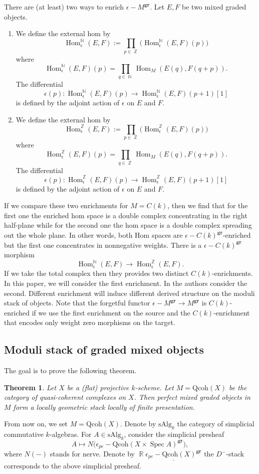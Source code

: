 \documentclass[reqno]{amsart}
\DeclareMathOperator\Z{\mathbb Z}
\DeclareMathOperator\R{\mathbb R}
\DeclareMathOperator\N{\mathbb N}
\newtheorem{theorem}{Theorem}[section]
\theoremstyle{definition}
\theoremstyle{remark}
\newcommand{\ul}{\underline}
\newcommand{\Hom}{\operatorname{Hom}}
\newcommand{\Spec}{\operatorname{Spec}}
\newcommand{\eps}{\epsilon}
\newcommand{\gr}{\mathbf{gr}}
\newcommand{\ep}{\epsilon}
\newcommand{\ska}{{\mathrm{sAlg}}_k}
\newcommand{\QC}{\mathrm{Qcoh}}
\numberwithin{equation}{section}
\begin{document}
There are (at least) two ways to enrich $\ep-M^\gr$. Let $E, F$ be two mixed graded objects.
\begin{enumerate}
\item[(1)] We define the external hom by
\[
\Hom^{\N}_\ep(E,F):=\prod_{p\in\Z}\Big(\Hom^{\N}_\ep(E,F)(p)\Big)
\] where 
\[
\Hom^{\N}_\ep(E,F)(p)=\prod_{q\in\N}\Hom_{M}(E(q),F(q+p)).
\] The differential 
\[
\ep(p): \Hom^{\N}_\ep(E,F)(p)\to \Hom^{\N}_\ep(E,F)(p+1)[1]
\] is defined by the adjoint action of $\ep$ on $E$ and $F$.
\item[(2)] We define the external hom by
\[
\Hom^{\Z}_\ep(E,F):=\prod_{p\in\Z}\Big(\Hom^{\Z}_\ep(E,F)(p)\Big)
\] where 
\[
\Hom^{\Z}_\ep(E,F)(p)=\prod_{q\in\Z}\Hom_{M}(E(q),F(q+p)).
\] The differential 
\[
\ep(p): \Hom^{\Z}_\ep(E,F)(p)\to \Hom^{\Z}_\ep(E,F)(p+1)[1]
\] is defined by the adjoint action of $\ep$ on $E$ and $F$.
\end{enumerate}
If we compare these two enrichments for $M=C(k)$, then we find that for the first one the enriched hom space is a double complex concentrating in the right half-plane while for the second one the hom space is a double complex spreading out the whole plane. In other words, both Hom spaces are $\eps-C(k)^\gr$-enriched but the first one concentrates in nonnegative weights.  There is a  $\eps-C(k)^\gr$ morphism  
\[
\Hom^{\N}_\ep(E,F)\to \Hom^{\Z}_\ep(E,F).
\]
If we take the total complex then they provides two distinct $C(k)$-enrichments.
In this paper, we will consider the first enrichment. In \cite{CPTVV} the authors consider the second. Different enrichment will induce different derived structure on the moduli stack of objects. Note that the forgetful functor $\ep-M^\gr\to M^\gr$ is $C(k)$-enriched if we use the first enrichment on the source and the $C(k)$-enrichment that encodes only weight zero morphisms on the target.


\subsection{Moduli stack of graded mixed objects}
The goal is to prove the following theorem.
\begin{theorem}\label{thm:epsmodulialgebraic}
Let $X$ be a (flat) projective $k$-scheme. Let $M=\QC(X)$ be the category of quasi-coherent complexes on $X$. Then perfect mixed graded objects in $M$ form a locally geometric stack locally of finite presentation. 
\end{theorem}

From now on, we set $M=\QC(X)$. 
Denote by $\ska$ the category of simplicial commutative $k$-algebras.
 For $A\in \ska$, consider the simplicial presheaf 
\[
A\mapsto N\Big(\ep_{pe}-\QC(X\times \Spec A)^\gr\Big),
\]
where $N(-)$ stands for nerve. Denote by $\R\ul{\ep_{pe}-\QC(X)^\gr}$ the $D^-$-stack corresponds to the above simplicial presheaf.  
 
\end{document}
